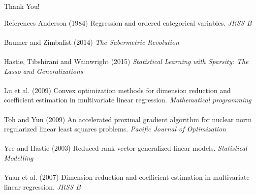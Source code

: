 \documentclass[handout]{beamer}
\begin{document}
\begin{frame}
\centering
\Large
Thank You!
\end{frame}

\begin{frame}{References}
\footnotesize
Anderson (1984) Regression and ordered categorical variables. {\it JRSS B}\\~\\
Baumer and Zimbalist (2014) {\it The Sabermetric Revolution}\\~\\
Hastie, Tibshirani and Wainwright (2015) {\it Statistical Learning with
    Sparsity: The Lasso and Generalizations}\\~\\
Lu et al. (2009) Convex optimization methods for dimension reduction and
    coefficient estimation in multivariate linear regression.
    {\it Mathematical programming}\\~\\
Toh and Yun (2009) An accelerated proximal gradient algorithm for nuclear norm
    regularized linear least squares problems.
    {\it Pacific Journal of Optimization}\\~\\
Yee and Hastie (2003) Reduced-rank vector generalized linear models.
    {\it Statistical Modelling}\\~\\
Yuan et al. (2007) Dimension reduction and coefficient estimation in
multivariate linear regression. {\it JRSS B}
\end{frame}
\end{document}
